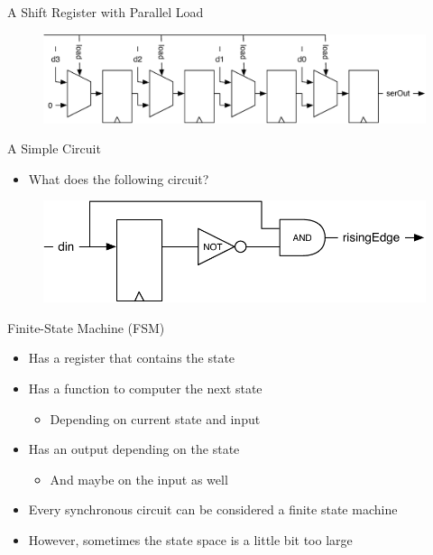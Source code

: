 \begin{frame}[fragile]{A Shift Register with Parallel Load}
\begin{figure}
  \includegraphics[scale=0.5]{../figures/shiftreg-paraload}
\end{figure}
\end{frame}


\begin{frame}[fragile]{A Simple Circuit}
\begin{itemize}
\item What does the following circuit?
\end{itemize}
\begin{figure}
  \includegraphics[scale=\scale]{../figures/fsm-rising}
\end{figure}
\end{frame}

\begin{frame}[fragile]{Finite-State Machine (FSM)}
\begin{itemize}
\item Has a register that contains the state
\item Has a function to computer the next state
\begin{itemize}
\item Depending on current state and input
\end{itemize}
\item Has an output depending on the state
\begin{itemize}
\item And maybe on the input as well
\end{itemize}
\item Every synchronous circuit can be considered a finite state machine
\item However, sometimes the state space is a little bit too large
\end{itemize}
\end{frame}

